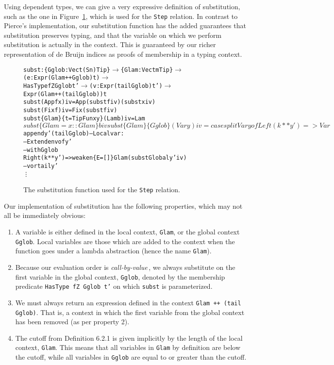 Using dependent types, we can give a very expressive definition of substitution, such as the one in Figure~\ref{fig:subst}, which is used for the \texttt{Step} relation. In contrast to Pierce's implementation, our substitution function has the added guarantees that substitution preserves typing, and that the variable on which we perform substitution is actually in the context. This is guaranteed by our richer representation of de Bruijn indices as proofs of membership in a typing context.  
\begin{figure}
\begin{alltt}
subst : \{Gglob : Vect (S n) Tip\} \(\rightarrow\) \{Glam: Vect m Tip\} \(\rightarrow\) 
                 (e: Expr (Glam ++ Gglob) t) \(\rightarrow\) 
                 HasType fZ Gglob t' \(\rightarrow\) (v: Expr (tail Gglob) t') \(\rightarrow\) 
                 Expr (Glam ++ (tail Gglob)) t
subst                     (App f x) i v = App (subst f i v) (subst x i v)
subst                       (Fix f) i v = Fix (subst f i v)
subst \{Glam\} \{t=TipFun x y\} (Lam b) i v = Lam $ subst \{Glam=x::Glam\} b i v
subst \{Glam\} \{Gglob\}        (Var y) i v = 
  case splitVar y of
    Left  (k ** y') => Var $ append y' (tail Gglob) -- Local var: 
                                                    -- Extend env of y'
                                                    -- with Gglob
    Right (k ** y') => weaken \{E=[]\} Glam (substGlobal y' i v) 
                                                    -- v or tail y'
\vdots
\end{alltt}
\caption{The substitution function used for the \texttt{Step} relation.}
\label{fig:subst}
\end{figure}
Our implementation of substitution has the following properties, which may not all be immediately obvious:
\begin{enumerate}
\item A variable is either defined in the local context, \texttt{Glam}, or the global context \texttt{Gglob}. Local variables are those which are added to the context when the function goes under a lambda abstraction (hence the name \texttt{Glam}).
\item Because our evaluation order is \emph{call-by-value}\,\cite[pp. 57-58]{Pierce:TypeSystems}, we always substitute on the first variable in the global context, \texttt{Gglob}, denoted by the membership predicate \texttt{HasType fZ Gglob t'} on which \texttt{subst} is parameterized. 
\item We must always return an expression defined in the context \texttt{Glam~++~(tail Gglob)}. That is, a context in which the first variable from the global context has been removed (as per property 2).
\item The cutoff from Definition 6.2.1 is given implicitly by the length of the local context, \texttt{Glam}. This means that all variables in \texttt{Glam} by definition are below the cutoff, while all variables in \texttt{Gglob} are equal to or greater than the cutoff.
\end{enumerate}

